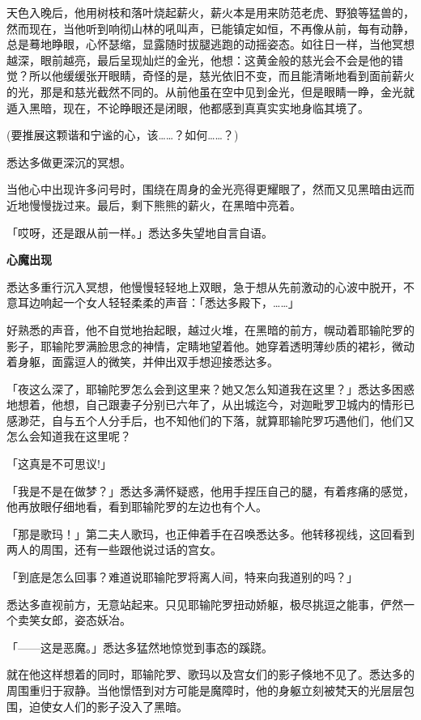 \documentclass[twoside,openany]{book}
\newcommand{\mt}[1]{\textbullet \textbf{#1}}
\begin{document}
天色入晚后，他用树枝和落叶烧起薪火，薪火本是用来防范老虎、野狼等猛兽的，然而现在，当他听到响彻山林的吼叫声，已能镇定如恒，不再像从前，每有动静，总是蓦地睁眼，心怀瑟缩，显露随时拔腿逃跑的动摇姿态。如往日一样，当他冥想越深，眼前越亮，最后呈现灿烂的金光，他想：这黄金般的慈光会不会是他的错觉？所以他缓缓张开眼睛，奇怪的是，慈光依旧不变，而且能清晰地看到面前薪火的光，那是和慈光截然不同的。从前他虽在空中见到金光，但是眼睛一睁，金光就遁入黑暗，现在，不论睁眼还是闭眼，他都感到真真实实地身临其境了。

(要推展这颗谐和宁谧的心，该……？如何……？)

悉达多做更深沉的冥想。

当他心中出现许多问号时，围绕在周身的金光亮得更耀眼了，然而又见黑暗由远而近地慢慢拢过来。最后，剩下熊熊的薪火，在黑暗中亮着。

「哎呀，还是跟从前一样。」悉达多失望地自言自语。

\mt{心魔出现}

悉达多重行沉入冥想，他慢慢轻轻地上双眼，急于想从先前激动的心波中脱开，不意耳边响起一个女人轻轻柔柔的声音：「悉达多殿下，……」

好熟悉的声音，他不自觉地抬起眼，越过火堆，在黑暗的前方，幌动着耶输陀罗的影子，耶输陀罗满脸思念的神情，定睛地望着他。她穿着透明薄纱质的裙衫，微动着身躯，面露逗人的微笑，并伸出双手想迎接悉达多。

「夜这么深了，耶输陀罗怎么会到这里来？她又怎么知道我在这里？」悉达多困惑地想着，他想，自己跟妻子分别已六年了，从出城迄今，对迦毗罗卫城内的情形已感渺茫，自与五个人分手后，也不知他们的下落，就算耶输陀罗巧遇他们，他们又怎么会知道我在这里呢？

「这真是不可思议!」

「我是不是在做梦？」悉达多满怀疑惑，他用手捏压自己的腿，有着疼痛的感觉，他再放眼仔细地看，看到耶输陀罗的左边也有个人。

「那是歌玛！」第二夫人歌玛，也正伸着手在召唤悉达多。他转移视线，这回看到两人的周围，还有一些跟他说过话的宫女。

「到底是怎么回事？难道说耶输陀罗将离人间，特来向我道别的吗？」

悉达多直视前方，无意站起来。只见耶输陀罗扭动娇躯，极尽挑逗之能事，俨然一个卖笑女郎，姿态妖冶。

「——这是恶魔。」悉达多猛然地惊觉到事态的蹊跷。

就在他这样想着的同时，耶输陀罗、歌玛以及宫女们的影子倏地不见了。悉达多的周围重归于寂静。当他憬悟到对方可能是魔障时，他的身躯立刻被梵天的光层层包围，迫使女人们的影子没入了黑暗。
\end{document}
